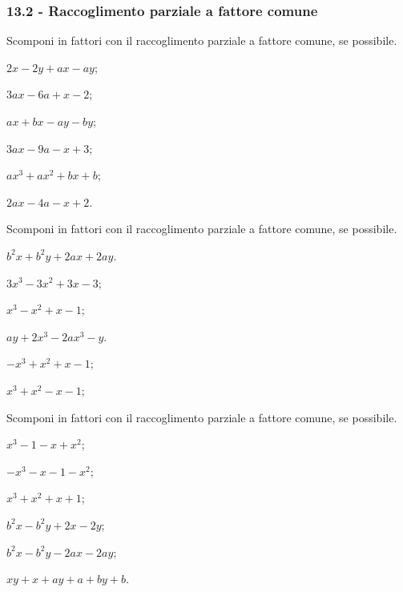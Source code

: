 \subsubsection*{13.2 - Raccoglimento parziale a fattore comune}

\begin{esercizio}[\Ast]
\label{ese:13.12}
Scomponi in fattori con il raccoglimento parziale a fattore comune, se possibile.
\begin{multicols}{3}
 \begin{enumeratea}
 \item $2x-2y+ax-ay$;
 \item $3ax-6a+x-2$;
 \item $ax+bx-ay-by$;
 \item $3ax-9a-x+3$;
 \item $ax^{3}+ax^{2}+bx+b$;
 \item $2ax-4a-x+2$.
\end{enumeratea}
\end{multicols}
\end{esercizio}

\begin{esercizio}[\Ast]
\label{ese:13.13}
Scomponi in fattori con il raccoglimento parziale a fattore comune, se possibile.
\begin{multicols}{2}
\begin{enumeratea}
 \item $b^{2}x+b^{2}y+2ax+2ay$.
 \item $3x^{3}-3x^{2}+3x-3$;
 \item $x^{3}-x^{2}+x-1$;
 \item $ay+2x^{3}-2ax^{3}-y$.
 \item $-x^{3}+x^{2}+x-1$;
 \item $x^{3}+x^{2}-x-1$;
\end{enumeratea}
\end{multicols}
\end{esercizio}

\begin{esercizio}[\Ast]
\label{ese:13.14}
Scomponi in fattori con il raccoglimento parziale a fattore comune, se possibile.
\begin{multicols}{2}
\begin{enumeratea}
 \item $x^{3}-1-x+x^{2}$;
 \item $-x^{3}-x-1-x^{2}$;
 \item $x^{3}+x^{2}+x+1$;
 \item $b^{2}x-b^{2}y+2x-2y$;
 \item $b^{2}x-b^{2}y-2ax-2ay$;
 \item $xy+x+ay+a+by+b$.
\end{enumeratea}
\end{multicols}
\end{esercizio}

